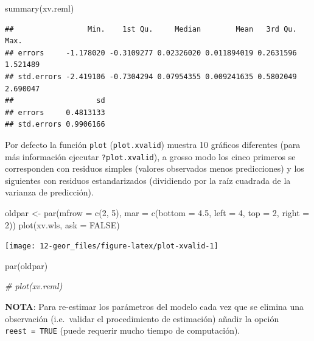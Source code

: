 \documentclass[
  spanish,
]{book}
\newenvironment{Shaded}{\begin{snugshade}}{\end{snugshade}}
\newcommand{\AttributeTok}[1]{\textcolor[rgb]{0.77,0.63,0.00}{#1}}
\newcommand{\CommentTok}[1]{\textcolor[rgb]{0.56,0.35,0.01}{\textit{#1}}}
\newcommand{\ConstantTok}[1]{\textcolor[rgb]{0.00,0.00,0.00}{#1}}
\newcommand{\DecValTok}[1]{\textcolor[rgb]{0.00,0.00,0.81}{#1}}
\newcommand{\FloatTok}[1]{\textcolor[rgb]{0.00,0.00,0.81}{#1}}
\newcommand{\FunctionTok}[1]{\textcolor[rgb]{0.00,0.00,0.00}{#1}}
\newcommand{\NormalTok}[1]{#1}
\newcommand{\OtherTok}[1]{\textcolor[rgb]{0.56,0.35,0.01}{#1}}
\theoremstyle{break}
\begin{document}
\begin{Shaded}
\begin{Highlighting}[]
\FunctionTok{summary}\NormalTok{(xv.reml)}
\end{Highlighting}
\end{Shaded}

\begin{verbatim}
##                 Min.    1st Qu.     Median        Mean   3rd Qu.     Max.
## errors     -1.178020 -0.3109277 0.02326020 0.011894019 0.2631596 1.521489
## std.errors -2.419106 -0.7304294 0.07954355 0.009241635 0.5802049 2.690047
##                   sd
## errors     0.4813133
## std.errors 0.9906166
\end{verbatim}

Por defecto la función \texttt{plot} (\texttt{plot.xvalid}) muestra 10 gráficos
diferentes (para más información ejecutar \texttt{?plot.xvalid}), a grosso modo
los cinco primeros se corresponden con residuos simples (valores
observados menos predicciones) y los siguientes con residuos
estandarizados (dividiendo por la raíz cuadrada de la varianza de
predicción).

\begin{Shaded}
\begin{Highlighting}[]
\NormalTok{oldpar }\OtherTok{\textless{}{-}} \FunctionTok{par}\NormalTok{(}\AttributeTok{mfrow =} \FunctionTok{c}\NormalTok{(}\DecValTok{2}\NormalTok{, }\DecValTok{5}\NormalTok{), }\AttributeTok{mar =} \FunctionTok{c}\NormalTok{(}\AttributeTok{bottom =} \FloatTok{4.5}\NormalTok{, }\AttributeTok{left =} \DecValTok{4}\NormalTok{, }\AttributeTok{top =} \DecValTok{2}\NormalTok{, }\AttributeTok{right =} \DecValTok{2}\NormalTok{))}
\FunctionTok{plot}\NormalTok{(xv.wls, }\AttributeTok{ask =} \ConstantTok{FALSE}\NormalTok{)}
\end{Highlighting}
\end{Shaded}

\begin{center}\texttt{[image: 12-geor\_files/figure-latex/plot-xvalid-1]} \end{center}

\begin{Shaded}
\begin{Highlighting}[]
\FunctionTok{par}\NormalTok{(oldpar)}

\CommentTok{\# plot(xv.reml)}
\end{Highlighting}
\end{Shaded}

\textbf{NOTA}: Para re-estimar los parámetros del modelo cada vez que se
elimina una observación (i.e.~validar el procedimiento de estimación)
añadir la opción \texttt{reest\ =\ TRUE} (puede requerir mucho tiempo de
computación).
\end{document}
